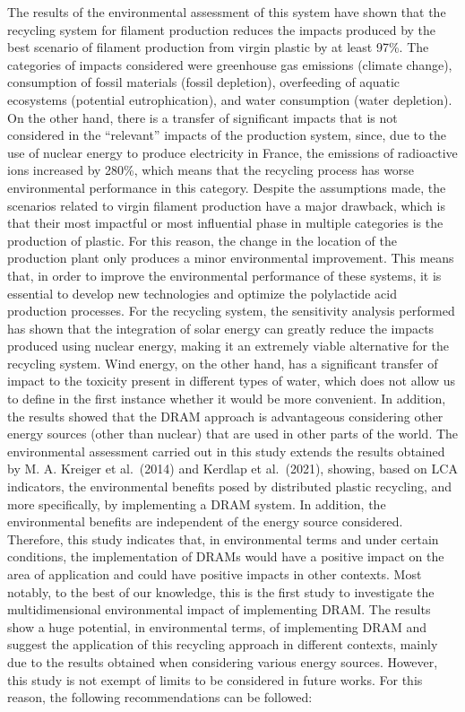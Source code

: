 \documentclass[]{elsarticle} %
\begin{document}
The results of the environmental assessment of this system have shown that the recycling system for filament production reduces the impacts produced by the best scenario of filament production from virgin plastic by at least 97\%. The categories of impacts considered were greenhouse gas emissions (climate change), consumption of fossil materials (fossil depletion), overfeeding of aquatic ecosystems (potential eutrophication), and water consumption (water depletion). On the other hand, there is a transfer of significant impacts that is not considered in the ``relevant'' impacts of the production system, since, due to the use of nuclear energy to produce electricity in France, the emissions of radioactive ions increased by 280\%, which means that the recycling process has worse environmental performance in this category.
Despite the assumptions made, the scenarios related to virgin filament production have a major drawback, which is that their most impactful or most influential phase in multiple categories is the production of plastic. For this reason, the change in the location of the production plant only produces a minor environmental improvement. This means that, in order to improve the environmental performance of these systems, it is essential to develop new technologies and optimize the polylactide acid production processes.
For the recycling system, the sensitivity analysis performed has shown that the integration of solar energy can greatly reduce the impacts produced using nuclear energy, making it an extremely viable alternative for the recycling system. Wind energy, on the other hand, has a significant transfer of impact to the toxicity present in different types of water, which does not allow us to define in the first instance whether it would be more convenient. In addition, the results showed that the DRAM approach is advantageous considering other energy sources (other than nuclear) that are used in other parts of the world.
The environmental assessment carried out in this study extends the results obtained by M. A. Kreiger et al.~(2014) and Kerdlap et al.~(2021), showing, based on LCA indicators, the environmental benefits posed by distributed plastic recycling, and more specifically, by implementing a DRAM system. In addition, the environmental benefits are independent of the energy source considered.
Therefore, this study indicates that, in environmental terms and under certain conditions, the implementation of DRAMs would have a positive impact on the area of application and could have positive impacts in other contexts. Most notably, to the best of our knowledge, this is the first study to investigate the multidimensional environmental impact of implementing DRAM. The results show a huge potential, in environmental terms, of implementing DRAM and suggest the application of this recycling approach in different contexts, mainly due to the results obtained when considering various energy sources.
However, this study is not exempt of limits to be considered in future works. For this reason, the following recommendations can be followed:
\end{document}
